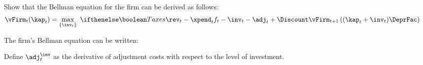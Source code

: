 {\item Show that the Bellman equation for the firm can be derived as follows:
\begin{equation}\begin{gathered}\begin{aligned}
  \vFirm_{t}(\kap_{t}) & =  \max_{\{\inv_{t}\}}~ \ifTax{\rev_{t}-\xpend_{t}}{f_{t}-\inv_{t}-\adj_{t}}+\Discount \vFirm_{t+1}\left((\kap_{t}+\inv_{t})\DeprFac\right)
\end{aligned}\end{gathered}\end{equation}
}{The firm's Bellman equation can be written:}

Define $\adj_{t}^{\inv}$ as the derivative of adjustment costs with respect to
the level of investment. \medskip

